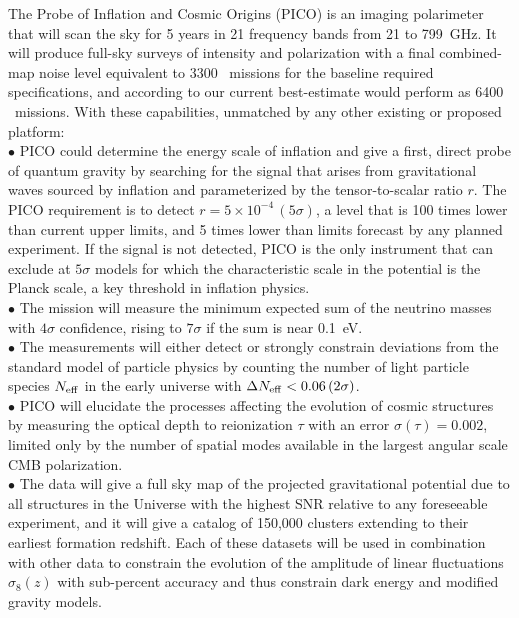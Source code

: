 \documentclass[PICOAPC.tex]{subfiles}
\begin{document}
The Probe of Inflation and Cosmic Origins (PICO) is an imaging polarimeter that will scan the sky for 5 years in 21 frequency bands from 21 to 799~GHz. It will produce full-sky surveys of intensity and polarization with a final combined-map noise level equivalent to 3300 \planck\ missions for the baseline required specifications, and according to our current best-estimate would perform as 6400 \planck\ missions. With these capabilities, unmatched by any other existing or proposed platform: \\
$\bullet$ PICO could determine the energy scale of inflation and give a first, direct probe of quantum gravity by searching for the signal that arises from gravitational waves sourced by inflation and parameterized by the tensor-to-scalar ratio $r$. The PICO requirement is to detect $r =5\times10^{-4} \, (5\sigma)$, a level that is 100 times lower than current upper limits, and 5 times lower than limits forecast by any planned experiment.  If the signal is not detected, PICO is the only instrument that can exclude at $5 \sigma$ models for which the characteristic scale in the potential is the Planck scale, a key threshold in inflation physics. \\ %
$\bullet$ The mission will measure the minimum expected sum of the neutrino masses with $4\sigma$ confidence, rising to $7\sigma$ if the sum is near 0.1~eV. \\ 
$\bullet$ The measurements will either detect or strongly constrain deviations from the standard model of particle physics by counting the number of light particle species $N_{\rm eff}$ in the early universe with $\Delta N_{\rm eff} < 0.06 \, (2\sigma)$.  \\
$\bullet$ PICO will elucidate the processes affecting the evolution of cosmic structures by measuring the optical depth to reionization $\tau$ with an error $\sigma(\tau) = 0.002$, limited only by the number of spatial modes available in the largest angular scale \ac{CMB} polarization. \\
$\bullet$ The data will give a full sky map of the projected gravitational potential due to all structures in the Universe with the highest \ac{SNR} relative to any foreseeable experiment, and it will give a catalog of 150,000 clusters extending to their earliest formation redshift. Each of these datasets will be used in combination with other data to constrain the evolution of the amplitude of linear fluctuations $\sigma_{8}(z)$ with sub-percent accuracy and thus constrain dark energy and modified gravity models.  \\
\end{document}
